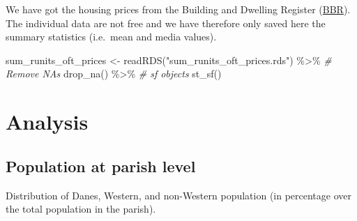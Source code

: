 \documentclass[
  12pt,
]{article}
\newenvironment{Shaded}{\begin{snugshade}}{\end{snugshade}}
\newcommand{\CommentTok}[1]{\textcolor[rgb]{0.56,0.35,0.01}{\textit{#1}}}
\newcommand{\FunctionTok}[1]{\textcolor[rgb]{0.00,0.00,0.00}{#1}}
\newcommand{\NormalTok}[1]{#1}
\newcommand{\OtherTok}[1]{\textcolor[rgb]{0.56,0.35,0.01}{#1}}
\newcommand{\SpecialCharTok}[1]{\textcolor[rgb]{0.00,0.00,0.00}{#1}}
\newcommand{\StringTok}[1]{\textcolor[rgb]{0.31,0.60,0.02}{#1}}
\begin{document}
We have got the housing prices from the Building and Dwelling Register
(\href{https://teknik.bbr.dk/forside}{BBR}). The individual data are not
free and we have therefore only saved here the summary statistics
(i.e.~mean and media values).

\begin{Shaded}
\begin{Highlighting}[]
\NormalTok{sum\_runits\_oft\_prices }\OtherTok{\textless{}{-}} \FunctionTok{readRDS}\NormalTok{(}\StringTok{"sum\_runits\_oft\_prices.rds"}\NormalTok{) }\SpecialCharTok{\%\textgreater{}\%} 
  \CommentTok{\# Remove NAs}
  \FunctionTok{drop\_na}\NormalTok{() }\SpecialCharTok{\%\textgreater{}\%} 
  \CommentTok{\# sf objects}
  \FunctionTok{st\_sf}\NormalTok{()}
\end{Highlighting}
\end{Shaded}

\hypertarget{analysis}{%
\section{Analysis}\label{analysis}}

\hypertarget{population-at-parish-level}{%
\subsection{Population at parish
level}\label{population-at-parish-level}}

Distribution of Danes, Western, and non-Western population (in
percentage over the total population in the parish).
\end{document}

